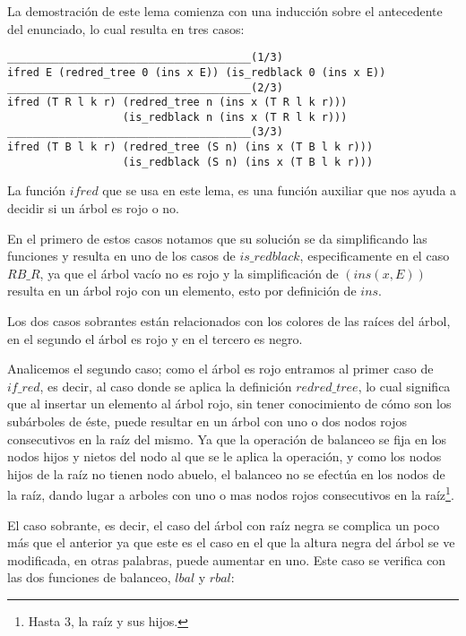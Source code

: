 La demostraci\'on de este lema comienza con una inducci\'on sobre el antecedente del enunciado, lo 
cual resulta en tres casos:

 \begin{verbatim}
______________________________________(1/3)
ifred E (redred_tree 0 (ins x E)) (is_redblack 0 (ins x E))
______________________________________(2/3)
ifred (T R l k r) (redred_tree n (ins x (T R l k r)))
                  (is_redblack n (ins x (T R l k r)))
______________________________________(3/3)
ifred (T B l k r) (redred_tree (S n) (ins x (T B l k r)))
                  (is_redblack (S n) (ins x (T B l k r)))
 \end{verbatim}

La funci\'on $ifred$ que se usa en este lema, es una funci\'on auxiliar que nos ayuda a decidir si
un \'arbol es rojo o no.

En el primero de estos casos notamos que su soluci\'on se da simplificando las funciones y resulta
en uno de los casos de \hyperref[inductive_isRedB]{$is\_redblack$}, especificamente en el caso 
$RB\_R$, ya que el \'arbol vacío no es rojo y la simplificaci\'on de $(ins(x,E))$ resulta en un 
\'arbol rojo con un elemento, esto por definici\'on de \hyperref[func_ins]{$ins$}.

Los dos casos sobrantes est\'an relacionados con los colores de las ra\'ices del \'arbol, en el
segundo el \'arbol es rojo y en el tercero es negro.

Analicemos el segundo caso; como el \'arbol es rojo entramos al primer caso de $if\_red$, es decir,
al caso donde se aplica la definici\'on \hyperref[inductive_isRedB]{$redred\_tree$}, lo cual 
significa que al insertar un elemento al \'arbol rojo, sin tener conocimiento de c\'omo son los 
subárboles de \'este, puede resultar en un \'arbol con uno o dos nodos rojos consecutivos en la ra\'iz 
del mismo. Ya que la operaci\'on de balanceo se fija en los nodos hijos y nietos del nodo al que se 
le aplica la operaci\'on, y como los nodos hijos de la raíz no tienen nodo abuelo, el balanceo no se 
efectúa en los nodos de la raíz, dando lugar a arboles con uno o mas nodos rojos consecutivos en la 
raíz\footnote{Hasta 3, la raíz y sus hijos.}.

El caso sobrante, es decir, el caso del \'arbol con raíz negra se complica un poco m\'as que el 
anterior ya que este es el caso en el que la altura negra del \'arbol se ve modificada, en otras 
palabras, puede aumentar en uno. Este caso se verifica con las dos funciones de balanceo, 
\hyperref[func_balanceo]{$lbal$} y \hyperref[func_balanceo]{$rbal$}:

